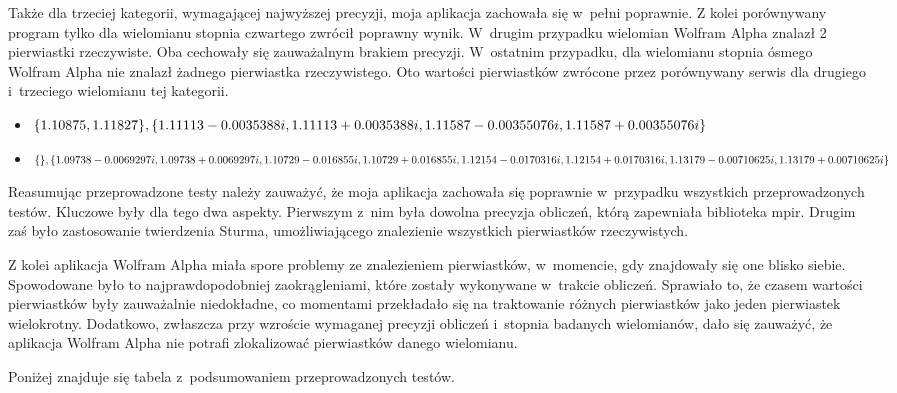 Także dla trzeciej kategorii, wymagającej najwyższej precyzji, moja aplikacja zachowała się w~pełni poprawnie. Z kolei porównywany program tylko dla wielomianu stopnia czwartego zwrócił poprawny wynik. W~drugim przypadku wielomian Wolfram Alpha znalazł 2 pierwiastki rzeczywiste. Oba cechowały się zauważalnym brakiem precyzji. W~ostatnim przypadku, dla wielomianu stopnia ósmego Wolfram Alpha nie znalazł żadnego pierwiastka rzeczywistego. Oto wartości pierwiastków zwrócone przez porównywany serwis dla drugiego i~trzeciego wielomianu tej kategorii.

\begin{itemize}
	\item $\{1.10875, 1.11827\}, \{1.11113-0.0035388i,1.11113+0.0035388i, \\
	1.11587-0.00355076i, 1.11587+0.00355076i\}$
	\item $\{\}, \{1.09738-0.0069297i,1.09738+0.0069297i, 1.10729-0.016855i, \\
	1.10729+0.016855i, 1.12154-0.0170316i, 1.12154+0.0170316i, 1.13179-0.00710625i, \\ 1.13179+0.00710625i\}$
\end{itemize}	

Reasumując przeprowadzone testy należy zauważyć, że moja aplikacja zachowała się poprawnie w~przypadku wszystkich przeprowadzonych testów. Kluczowe były dla tego dwa aspekty. Pierwszym z~nim była dowolna precyzja obliczeń, którą zapewniała biblioteka mpir. Drugim zaś było zastosowanie twierdzenia Sturma, umożliwiającego znalezienie wszystkich pierwiastków rzeczywistych.

Z kolei aplikacja Wolfram Alpha miała spore problemy ze znalezieniem pierwiastków, w~momencie, gdy znajdowały się one blisko siebie. Spowodowane było to najprawdopodobniej zaokrągleniami, które zostały wykonywane w~trakcie obliczeń. Sprawiało to, że czasem wartości pierwiastków były zauważalnie niedokładne, co momentami przekładało się na traktowanie różnych pierwiastków jako jeden pierwiastek wielokrotny. Dodatkowo, zwłaszcza przy wzroście wymaganej precyzji obliczeń i~stopnia badanych wielomianów, dało się zauważyć, że aplikacja Wolfram Alpha nie potrafi zlokalizować pierwiastków danego wielomianu.

Poniżej znajduje się tabela z~podsumowaniem przeprowadzonych testów.

